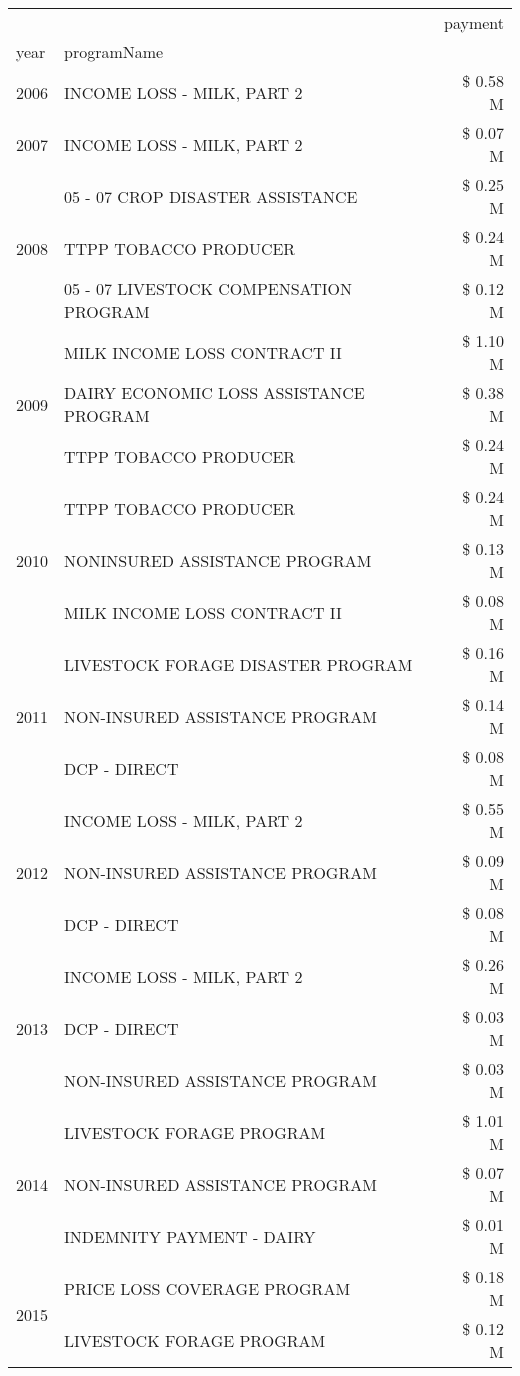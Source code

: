 \begin{tabular}{llr}
\toprule
 &  & payment \\
year & programName &  \\
\midrule
2006 & INCOME LOSS - MILK, PART 2 & \$ 0.58 M \\
\cline{1-3}
2007 & INCOME LOSS - MILK, PART 2 & \$ 0.07 M \\
\cline{1-3}
\multirow[t]{3}{*}{2008} & 05 - 07 CROP DISASTER ASSISTANCE & \$ 0.25 M \\
 & TTPP TOBACCO PRODUCER & \$ 0.24 M \\
 & 05 - 07 LIVESTOCK COMPENSATION PROGRAM & \$ 0.12 M \\
\cline{1-3}
\multirow[t]{3}{*}{2009} & MILK INCOME LOSS CONTRACT II & \$ 1.10 M \\
 & DAIRY ECONOMIC LOSS ASSISTANCE PROGRAM & \$ 0.38 M \\
 & TTPP TOBACCO PRODUCER & \$ 0.24 M \\
\cline{1-3}
\multirow[t]{3}{*}{2010} & TTPP TOBACCO PRODUCER & \$ 0.24 M \\
 & NONINSURED ASSISTANCE PROGRAM & \$ 0.13 M \\
 & MILK INCOME LOSS CONTRACT II & \$ 0.08 M \\
\cline{1-3}
\multirow[t]{3}{*}{2011} & LIVESTOCK FORAGE DISASTER PROGRAM & \$ 0.16 M \\
 & NON-INSURED ASSISTANCE PROGRAM & \$ 0.14 M \\
 & DCP - DIRECT & \$ 0.08 M \\
\cline{1-3}
\multirow[t]{3}{*}{2012} & INCOME LOSS - MILK, PART 2 & \$ 0.55 M \\
 & NON-INSURED ASSISTANCE PROGRAM & \$ 0.09 M \\
 & DCP - DIRECT & \$ 0.08 M \\
\cline{1-3}
\multirow[t]{3}{*}{2013} & INCOME LOSS - MILK, PART 2 & \$ 0.26 M \\
 & DCP - DIRECT & \$ 0.03 M \\
 & NON-INSURED ASSISTANCE PROGRAM & \$ 0.03 M \\
\cline{1-3}
\multirow[t]{3}{*}{2014} & LIVESTOCK FORAGE PROGRAM & \$ 1.01 M \\
 & NON-INSURED ASSISTANCE PROGRAM & \$ 0.07 M \\
 & INDEMNITY PAYMENT - DAIRY & \$ 0.01 M \\
\cline{1-3}
\multirow[t]{3}{*}{2015} & PRICE LOSS COVERAGE PROGRAM & \$ 0.18 M \\
 & LIVESTOCK FORAGE PROGRAM & \$ 0.12 M \\

\end{tabular}
